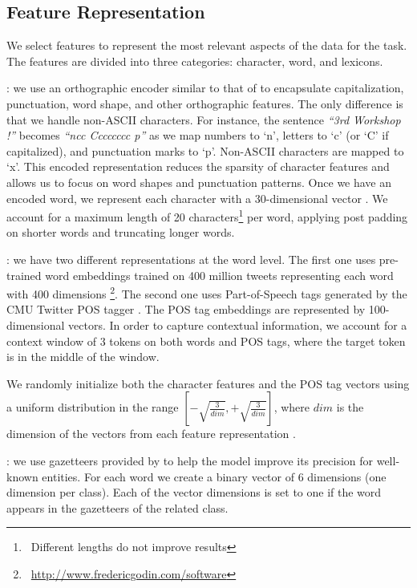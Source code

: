 \documentclass[11pt,letterpaper]{article}
\begin{document}
\subsection{Feature Representation} \label{feature_rep}

We select features to represent the most relevant aspects of the data for the task. The features are divided into three categories: character, word, and lexicons.

: we use an orthographic encoder similar to that of \citet{limsopatham2016_wnut_ner} to encapsulate capitalization, punctuation, word shape, and other orthographic features. The only difference is that we handle non-ASCII characters. For instance, the sentence \emph{``3rd Workshop !''} becomes \emph{``ncc Cccccccc p''} as we map numbers to `n', letters to `c' (or `C' if capitalized), and punctuation marks to `p'. Non-ASCII characters are mapped to `x'. This encoded representation reduces the sparsity of character features and allows us to focus on word shapes and punctuation patterns. Once we have an encoded word, we represent each character with a 30-dimensional vector \cite{DBLP:journals/corr/MaH16}. We account for a maximum length of 20 characters\footnote{~Different lengths do not improve results} per word, applying post padding on shorter words and truncating longer words.

: we have two different representations at the word level. The first one uses pre-trained word embeddings trained on 400 million tweets representing each word with 400 dimensions \cite{godin2015multimedia}\footnote{~\url{http://www.fredericgodin.com/software}}. The second one uses Part-of-Speech tags generated by the CMU Twitter POS tagger \cite{owoputi2013improved}. The POS tag embeddings are represented by 100-dimensional vectors. In order to capture contextual information, we account for a context window of 3 tokens on both words and POS tags, where the target token is in the middle of the window.

We randomly initialize both the character features and the POS tag vectors using a uniform distribution in the range \(\left[-\sqrt{\frac{3}{dim}}, +\sqrt{\frac{3}{dim}}\right]\), where \(dim\) is the dimension of the vectors from each feature representation \cite{he2015delving}.

: we use gazetteers provided by \citet{mishra2016_wnut_ner} to help the model improve its precision for well-known entities. For each word we create a binary vector of 6 dimensions (one dimension per class). Each of the vector dimensions is set to one if the word appears in the gazetteers of the related class.
\end{document}
